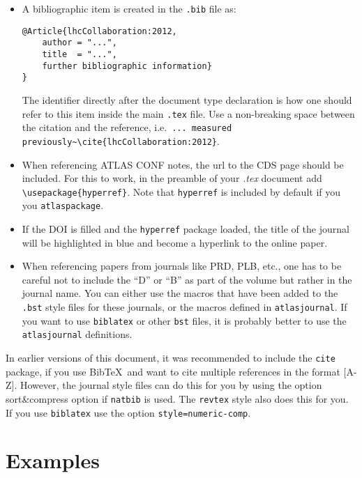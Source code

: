 \documentclass[UKenglish]{latex/atlasdoc}
\newcommand*{\BibTeX}{Bib\TeX}
\newcommand{\File}[1]{\texttt{#1}\xspace}
\newcommand{\Option}[1]{\textsf{#1}\xspace}
\newcommand{\Package}[1]{\texttt{#1}\xspace}
\begin{document}
\begin{itemize}
\item A bibliographic item is created in the \File{.bib} file as:
\begin{verbatim}
@Article{lhcCollaboration:2012,
	author = "...",
	title  = "...",
	further bibliographic information}
}
\end{verbatim}
	The identifier directly after the document type declaration is how one should refer to this item inside the main \File{.tex} file.
	Use a non-breaking space between the citation and the reference, i.e.\
	\verb|... measured previously~\cite{lhcCollaboration:2012}|.
\item When referencing ATLAS CONF notes, the url to the CDS page should be included.
	For this to work, in the preamble of your \emph{.tex} document add
	\texttt{\textbackslash usepackage\{hyperref\}}.
	Note that \Package{hyperref} is included by default	if you you \Package{atlaspackage}.
\item If the DOI is filled and the \texttt{hyperref} package loaded, 
	the title of the journal will be highlighted in blue and become a hyperlink to the online paper.
\item When referencing papers from journals like PRD, PLB, etc.,
	one has to be careful not to include the ``D'' or ``B'' as part of the volume but rather in the journal name. 
	You can either use the macros that have been added to the \File{.bst} style files for these journals, or
	the macros defined in \Package{atlasjournal}.
	If you want to use \Package{biblatex} or other \File{bst} files, it is probably better to use the
	\Package{atlasjournal} definitions.
\end{itemize}

In earlier versions of this document, it was recommended to include the \Package{cite} package, 
if you use \BibTeX\ and want to cite multiple references in the format [A-Z].
However, the journal style files can do this for you by using the option \Option{sort\&compress} option if \Package{natbib} is used.
The \texttt{revtex} style also does this for you.
If you use \texttt{biblatex} use the option \texttt{style=numeric-comp}.

\section{Examples}
\end{document}
